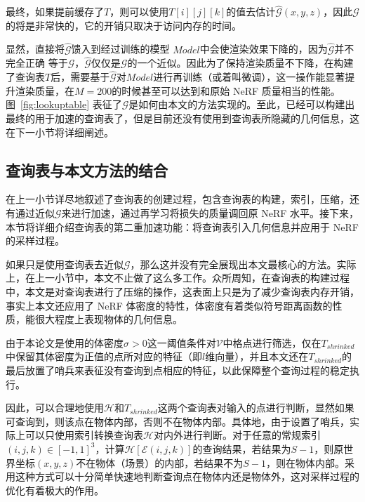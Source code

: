 最终，如果提前缓存了$T$，则可以使用$T\left[i \right]\left[j \right]\left[k \right]$的值去估计$\hat{\mathcal{G}}\left(x, y, z\right)$，因此$\hat{\mathcal{G}}$的将是非常快的，它的开销只取决于访问内存的时间。

显然，直接将$\hat{\mathcal{G}}$馈入到经过训练的模型 $Model$中会使渲染效果下降的，因为$\hat{\mathcal{G}}$并不完全正确
等于$\mathcal{G}$，$\hat{\mathcal{G}}$仅仅是$\mathcal{G}$的一个近似。因此为了保持渲染质量不下降，在构建了查询表$T$后，需要基于$\hat{\mathcal{G}}$对$Model$进行再训练（或着叫微调），这一操作能显著提升渲染质量，在$M = 200$的时候甚至可以达到和原始 NeRF 质量相当的性能。图~\ref{fig:lookuptable} 表征了$\mathcal{G}$是如何由本文的方法实现的。至此，已经可以构建出最终的用于加速的查询表了，但是目前还没有使用到查询表所隐藏的几何信息，这在下一小节将详细阐述。

\subsection{查询表与本文方法的结合}
在上一小节详尽地叙述了查询表的创建过程，包含查询表的构建，索引，压缩，还有通过近似$\mathcal{G}$来进行加速，通过再学习将损失的质量调回原 NeRF 水平。接下来，本节将详细介绍查询表的第二重加速功能：将查询表引入几何信息并应用于 NeRF 的采样过程。

如果只是使用查询表去近似$\mathcal{G}$，那么这并没有完全展现出本文最核心的方法。实际上，在上一小节中，本文不止做了这么多工作。众所周知，在查询表的构建过程中，本文是对查询表进行了压缩的操作，这表面上只是为了减少查询表内存开销，事实上本文还应用了 NeRF 体密度的特性，体密度有着类似符号距离函数的性质，能很大程度上表现物体的几何信息。

由于本论文是使用的体密度$\sigma > 0$这一阈值条件对$\mathcal{V}$中格点进行筛选，仅在$T_{shrinked}$中保留其体密度为正值的点所对应的特征（即$l$维向量），并且本文还在$T_{shrinked}$的最后放置了哨兵来表征没有查询到点相应的特征，以此保障整个查询过程的稳定执行。

因此，可以合理地使用$\mathcal{H}$和$T_{shrinked}$这两个查询表对输入的点进行判断，显然如果可查询到，则该点在物体内部，否则不在物体内部。具体地，由于设置了哨兵，实际上可以只使用索引转换查询表$\mathcal{H}$对内外进行判断。对于任意的常规索引$\left(i, j, k\right) \in \left[-1, 1\right]^3$，计算$\mathcal{H}\left[\mathcal{E}\left(i, j, k\right)\right]$的查询结果，若结果为$S - 1$，则原世界坐标$\left(x, y, z\right)$不在物体（场景）的内部，若结果不为$S - 1$，则在物体内部。采用这种方式可以十分简单快速地判断查询点在物体内还是物体外，这对采样过程的优化有着极大的作用。

